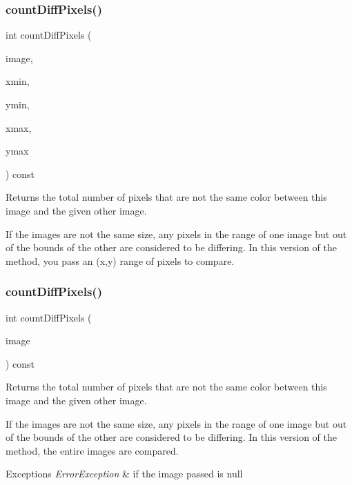\subsubsection{\texorpdfstring{count\+Diff\+Pixels()}{countDiffPixels()}\hspace{0.1cm}{\footnotesize\ttfamily [2/4]}}
{\footnotesize\ttfamily int count\+Diff\+Pixels (\begin{DoxyParamCaption}\item[{const \mbox{\hyperlink{classGCanvas}{G\+Canvas}} \&}]{image,  }\item[{int}]{xmin,  }\item[{int}]{ymin,  }\item[{int}]{xmax,  }\item[{int}]{ymax }\end{DoxyParamCaption}) const\hspace{0.3cm}{\ttfamily [virtual]}}



Returns the total number of pixels that are not the same color between this image and the given other image. 

If the images are not the same size, any pixels in the range of one image but out of the bounds of the other are considered to be differing. In this version of the method, you pass an (x,y) range of pixels to compare. \mbox{\label{classGCanvas_a443b0f63a197c0f1147b13077f4206e0}} 
\subsubsection{\texorpdfstring{count\+Diff\+Pixels()}{countDiffPixels()}\hspace{0.1cm}{\footnotesize\ttfamily [3/4]}}
{\footnotesize\ttfamily int count\+Diff\+Pixels (\begin{DoxyParamCaption}\item[{const \mbox{\hyperlink{classGCanvas}{G\+Canvas}} $\ast$}]{image }\end{DoxyParamCaption}) const\hspace{0.3cm}{\ttfamily [virtual]}}



Returns the total number of pixels that are not the same color between this image and the given other image. 

If the images are not the same size, any pixels in the range of one image but out of the bounds of the other are considered to be differing. In this version of the method, the entire images are compared. 
\begin{DoxyExceptions}{Exceptions}
{\em Error\+Exception} & if the image passed is null \\
\hline
\end{DoxyExceptions}
\mbox{\label{classGCanvas_a77b38a94630c93ecc697fb12a1fb89fd}} 
